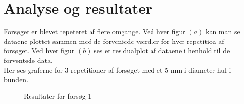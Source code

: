 \documentclass[a4paper, 11pt]{article}
\begin{document}
\section{Analyse og resultater}
Forsøget er blevet repeteret af flere omgange. Ved hver figur \((a)\) kan man se dataene plottet sammen med de forventede værdier for hver repetition af forsøget. Ved hver figur \((b)\) ses et residualplot af dataene i henhold til de forventede data.\\
Her ses graferne for 3 repetitioner af forsøget med et 5 mm i diameter hul i bunden.
\begin{figure}[!h]%
    \centering
    \quad
    \caption{Resultater for forsøg 1}%
    \label{fig:resultat1}%
\end{figure}\\
\end{document}
